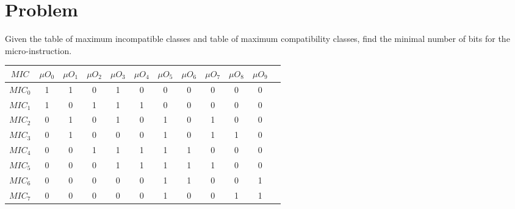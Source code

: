 \section*{Problem}

Given the table of maximum incompatible classes and table of maximum compatibility classes, find the minimal number of bits for the micro-instruction.


\begin{table}[H]
    \centering
        \begin{tabular}{|c|c|c|c|c|c|c|c|c|c|c|c|}
            \hline
            $MIC$ & $\mu O_{0}$ & $\mu O_{1}$ & $\mu O_{2}$ & $\mu O_{3}$ & $\mu O_{4}$ & $\mu O_{5}$ & $\mu O_{6}$ & $\mu O_{7}$ & $\mu O_{8}$ & $\mu O_{9}$ \\ \hline
            $MIC_{0}$ & 1 & 1 & 0 & 1 & 0 & 0 & 0 & 0 & 0 & 0 \\ \hline
            $MIC_{1}$ & 1 & 0 & 1 & 1 & 1 & 0 & 0 & 0 & 0 & 0 \\ \hline
            $MIC_{2}$ & 0 & 1 & 0 & 1 & 0 & 1 & 0 & 1 & 0 & 0 \\ \hline
            $MIC_{3}$ & 0 & 1 & 0 & 0 & 0 & 1 & 0 & 1 & 1 & 0 \\ \hline
            $MIC_{4}$ & 0 & 0 & 1 & 1 & 1 & 1 & 1 & 0 & 0 & 0 \\ \hline
            $MIC_{5}$ & 0 & 0 & 0 & 1 & 1 & 1 & 1 & 1 & 0 & 0 \\ \hline
            $MIC_{6}$ & 0 & 0 & 0 & 0 & 0 & 1 & 1 & 0 & 0 & 1 \\ \hline
            $MIC_{7}$ & 0 & 0 & 0 & 0 & 0 & 1 & 0 & 0 & 1 & 1 \\ \hline
        \end{tabular}
\end{table}

